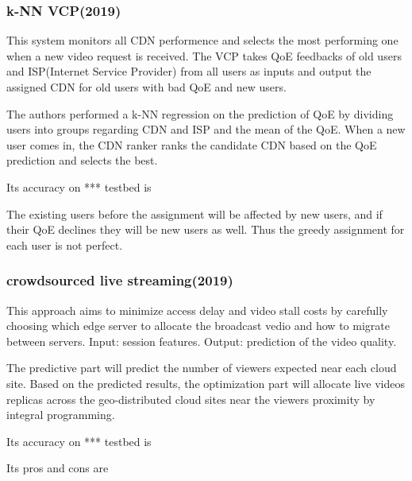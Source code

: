 \documentclass{ctexart}
\begin{document}
\subsubsection{k-NN VCP(2019)\cite{DBLP:journals/adhoc/CiccoMP19}}
\par This system monitors all CDN performence and selects the most performing one when a new video request is received. The VCP takes QoE feedbacks of old users and ISP(Internet Service Provider) from all users as inputs and output the assigned CDN for old users with bad QoE and new users.
\par The authors performed a k-NN regression on the prediction of QoE by dividing users into groups regarding CDN and ISP and the mean of the QoE. When a new user comes in, the CDN ranker ranks the candidate CDN based on the QoE prediction and selects the best.
\par Its accuracy on *** testbed is 
\par The existing users before the assignment will be affected by new users, and if their QoE declines they will be new users as well. Thus the greedy assignment for each user is not perfect.
\subsubsection{crowdsourced live streaming(2019)\cite{DBLP:conf/icc/HaouariBEMG19}}
\par This approach aims to minimize access delay and video stall costs by carefully choosing which edge server to allocate the broadcast vedio and how to migrate between servers.  Input: session features. Output: prediction of the video quality.
\par The predictive part will predict the number of viewers expected near each cloud site. Based on the predicted results, the optimization part will allocate live videos replicas across the geo-distributed cloud sites near the viewers proximity by integral programming.
\par Its accuracy on *** testbed is 
\par Its pros and cons are
\end{document}
